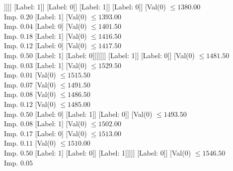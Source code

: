 \documentclass[margin=10pt]{standalone}
\begin{document}
\begin{forest}
																[Val($0$) $ \leq 1320.00$ \\ Imp. $0.03$
																	[Label: 0]
																	[Val($0$) $ \leq 1324.50$ \\ Imp. $0.17$
																		[Label: 1]
																		[Val($0$) $ \leq 1331.00$ \\ Imp. $0.06$
																			[Label: 0]
																			[Val($0$) $ \leq 1338.50$ \\ Imp. $0.44$
																				[Label: 1]
																				[Label: 0]]]]]
																[Label: 1]]
															[Label: 0]]
														[Label: 1]]
													[Label: 0]]
												[Val($0$) $ \leq 1380.00$ \\ Imp. $0.20$
													[Label: 1]
													[Val($0$) $ \leq 1393.00$ \\ Imp. $0.04$
														[Label: 0]
														[Val($0$) $ \leq 1401.50$ \\ Imp. $0.18$
															[Label: 1]
															[Val($0$) $ \leq 1416.50$ \\ Imp. $0.12$
																[Label: 0]
																[Val($0$) $ \leq 1417.50$ \\ Imp. $0.50$
																	[Label: 1]
																	[Label: 0]]]]]]]
											[Label: 1]]
										[Label: 0]]
									[Val($0$) $ \leq 1481.50$ \\ Imp. $0.03$
										[Label: 1]
										[Val($0$) $ \leq 1529.50$ \\ Imp. $0.01$
											[Val($0$) $ \leq 1515.50$ \\ Imp. $0.07$
												[Val($0$) $ \leq 1491.50$ \\ Imp. $0.08$
													[Val($0$) $ \leq 1486.50$ \\ Imp. $0.12$
														[Val($0$) $ \leq 1485.00$ \\ Imp. $0.50$
															[Label: 0]
															[Label: 1]]
														[Label: 0]]
													[Val($0$) $ \leq 1493.50$ \\ Imp. $0.08$
														[Label: 1]
														[Val($0$) $ \leq 1502.00$ \\ Imp. $0.17$
															[Label: 0]
															[Val($0$) $ \leq 1513.00$ \\ Imp. $0.11$
																[Val($0$) $ \leq 1510.00$ \\ Imp. $0.50$
																	[Label: 1]
																	[Label: 0]]
																[Label: 1]]]]]
												[Label: 0]]
											[Val($0$) $ \leq 1546.50$ \\ Imp. $0.05$

\end{forest}
\end{document}
